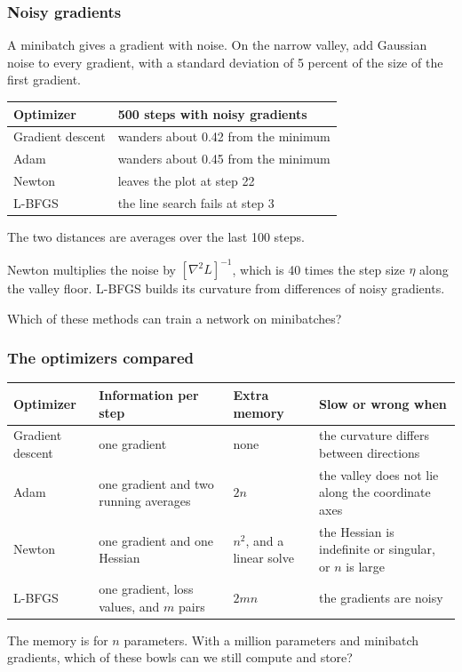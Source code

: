 \documentclass{beamer}
\begin{document}
\begin{frame}
\frametitle{Noisy gradients}
A minibatch gives a gradient with noise.
On the narrow valley, add Gaussian noise to every gradient, with a standard deviation of 5 percent of the size of the first gradient.
\begin{center}
\begin{tabular}{ll}
\toprule
Optimizer & 500 steps with noisy gradients\\
\midrule
Gradient descent & wanders about 0.42 from the minimum\\
Adam & wanders about 0.45 from the minimum\\
Newton & leaves the plot at step 22\\
L-BFGS & the line search fails at step 3\\
\bottomrule
\end{tabular}
\end{center}
The two distances are averages over the last 100 steps.
\medskip

Newton multiplies the noise by $[\nabla^2L]^{-1}$, which is 40 times the step size $\eta$ along the valley floor.
L-BFGS builds its curvature from differences of noisy gradients.
\medskip

Which of these methods can train a network on minibatches?
\end{frame}

\begin{frame}
\frametitle{The optimizers compared}
\begin{center}
\small
\begin{tabular}{L{0.19\textwidth}L{0.25\textwidth}L{0.13\textwidth}L{0.28\textwidth}}
\toprule
Optimizer & Information per step & Extra memory & Slow or wrong when\\
\midrule
Gradient descent & one gradient & none & the curvature differs between directions\\
\addlinespace
Adam & one gradient and two running averages & $2n$ & the valley does not lie along the coordinate axes\\
\addlinespace
Newton & one gradient and one Hessian & $n^2$, and a linear solve & the Hessian is indefinite or singular, or $n$ is large\\
\addlinespace
L-BFGS & one gradient, loss values, and $m$ pairs & $2mn$ & the gradients are noisy\\
\bottomrule
\end{tabular}
\end{center}
\medskip
The memory is for $n$ parameters.
With a million parameters and minibatch gradients, which of these bowls can we still compute and store?
\end{frame}
\end{document}
